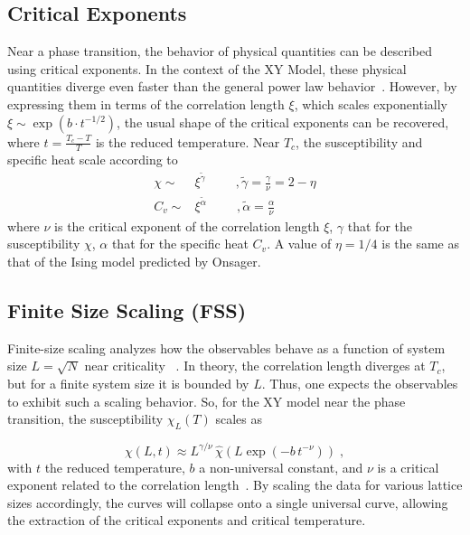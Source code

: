 \subsection{Critical Exponents}
Near a phase transition, the behavior of physical quantities can be described using critical exponents.
In the context of the XY Model, these physical quantities diverge even faster than the general power law behavior~\cite{Kosterlitz1974}.
However, by expressing them in terms of the correlation length $\xi$, which scales exponentially $\xi \sim \exp(b\cdot t^{-1/2})$, the usual shape of the critical exponents can be recovered, where $t = \frac{T_c - T}{T}$ is the reduced temperature.
Near $T_c$, the susceptibility and specific heat scale according to
\begin{align}
  \chi \sim & \xi^{\tilde{\gamma}} \hspace{1cm}, \tilde{\gamma} = \frac{\gamma}{\nu} = 2 - \eta\\
  C_v \sim & \xi^{\tilde{\alpha}} \hspace{1cm}, \tilde{\alpha} = \frac{\alpha}{\nu}
\end{align}
where $\nu$ is the critical exponent of the correlation length $\xi$, $\gamma$ that for the susceptibility $\chi$, $\alpha$ that for the specific heat $C_v$.
A value of $\eta = 1/4$ is the same as that of the Ising model predicted by Onsager.~\cite{Kosterlitz1974}

\subsection{Finite Size Scaling (FSS)}
Finite-size scaling analyzes how the observables behave as a function of system size $L = \sqrt{N}$ near criticality ~\cite{Privman1989}.
In theory, the correlation length diverges at $T_c$, but for a finite system size it is bounded by $L$.
Thus, one expects the observables to exhibit such a scaling behavior.
So, for the XY model near the phase transition, the susceptibility $\chi_L(T)$ scales as

\begin{equation}
  \chi(L,t) \approx L^{\gamma/\nu} \,\hat{\chi}\!\left( L \exp\!\left(-b\, t^{-\nu}\right) \right) \;,
  \label{eq:Susceptibility_Scale}
\end{equation}
with $t$ the reduced temperature, $b$ a non-universal constant, and $\nu$ is a critical exponent related to the correlation length~\cite{Sale2021}.
By scaling the data for various lattice sizes accordingly, the curves will collapse onto a single universal curve, allowing the extraction of the critical exponents and critical temperature.

